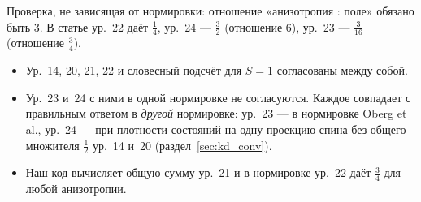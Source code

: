 \begin{cmpbox}
Проверка, не зависящая от нормировки: отношение «анизотропия : поле»
обязано быть $3$. В статье ур.~22 даёт $\tfrac14$, ур.~24 --- $\tfrac32$ (отношение 6),
ур.~23 --- $\tfrac3{16}$ (отношение $\tfrac34$).
\begin{itemize}
\item Ур.~14, 20, 21, 22 и словесный подсчёт для $S=1$ согласованы между собой.
\item Ур.~23 и~24 с ними в одной нормировке не согласуются. Каждое совпадает с
  правильным ответом в \emph{другой} нормировке: ур.~23 --- в нормировке Oberg et al.,
  ур.~24 --- при плотности состояний на одну проекцию спина без общего
  множителя $\tfrac12$ ур.~14 и~20 (раздел~\ref{sec:kd_conv}).
\item Наш код вычисляет общую сумму ур.~21 и в нормировке ур.~22 даёт $\tfrac34$
  для любой анизотропии.
\end{itemize}
\end{cmpbox}

